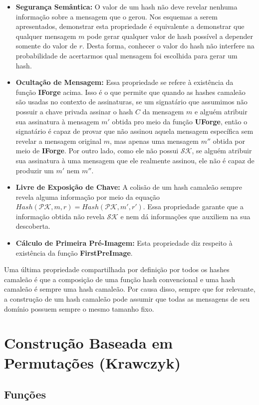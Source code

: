 \documentclass[a4paper]{article}
\begin{document}
\begin{itemize}
\item\textbf{Segurança Semântica: }O valor de um hash não deve
  revelar nenhuma informação sobre a mensagem que o gerou. Nos
  esquemas a serem apresentados, demonstrar esta propriedade é
  equivalente a demonstrar que qualquer mensagem $m$ pode gerar
  qualquer valor de hash possível a depender somente do valor de
  $r$. Desta forma, conhecer o valor do hash não interfere na
  probabilidade de acertarmos qual mensagem foi escolhida para gerar
  um hash.
\item\textbf{Ocultação de Mensagem: }Essa propriedade se refere à
  existência da função \textbf{IForge} acima. Isso é o que permite que
  quando as hashes camaleão são usadas no contexto de assinaturas, se
  um signatário que assumimos não possuir a chave privada assinar o
  hash $C$ da mensagem $m$ e alguém atribuir sua assinatura à mensagem
  $m'$ obtida pro meio da função \textbf{UForge}, então o signatário é
  capaz de provar que não assinou aquela mensagem específica sem
  revelar a mensagem original $m$, mas apenas uma mensagem $m''$
  obtida por meio de \textbf{IForge}. Por outro lado, como ele não
  possui $\mathcal{SK}$, se alguém atribuir sua assinatura à uma
  mensagem que ele realmente assinou, ele não é capaz de produzir um
  $m'$ nem $m''$.
\item\textbf{Livre de Exposição de Chave: }A colisão de um hash
  camaleão sempre revela alguma informação por meio da equação
  $Hash(\mathcal{PK}, m, r) = Hash(\mathcal{PK}, m', r')$. Essa
  propriedade garante que a informação obtida não revela
  $\mathcal{SK}$ e nem dá informações que auxiliem na sua descoberta.
\item\textbf{Cálculo de Primeira Pré-Imagem: }Esta propriedade diz
  respeito à existência da função \textbf{FirstPreImage}.
\end{itemize}

Uma última propriedade compartilhada por definição por todos os hashes
camaleão é que a composição de uma função hash convencional e uma hash
camaleão é sempre uma hash camaleão. Por causa disso, sempre que for
relevante, a construção de um hash camaleão pode assumir que todas as
mensagens de seu domínio possuem sempre o mesmo tamanho fixo.

\section{Construção Baseada em Permutações (Krawczyk) \cite{krawczyk}}

\subsection{Funções}
\end{document}
